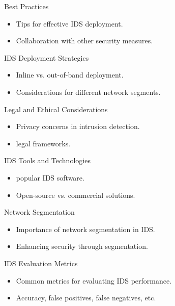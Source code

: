\documentclass{beamer}
\begin{document}
\begin{frame}{Best Practices}
    \begin{itemize}
        \item Tips for effective IDS deployment.
        \item Collaboration with other security measures.
    \end{itemize}
\end{frame}



\begin{frame}{IDS Deployment Strategies}
    \begin{itemize}
        \item Inline vs. out-of-band deployment.
        \item Considerations for different network segments.
    \end{itemize}
\end{frame}


\begin{frame}{Legal and Ethical Considerations}
    \begin{itemize}
        \item Privacy concerns in intrusion detection.
        \item legal frameworks.
    \end{itemize}
\end{frame}


\begin{frame}{IDS Tools and Technologies}
    \begin{itemize}
        \item popular IDS software.
        \item Open-source vs. commercial solutions.
    \end{itemize}
\end{frame}


\begin{frame}{Network Segmentation}
    \begin{itemize}
        \item Importance of network segmentation in IDS.
        \item Enhancing security through segmentation.
    \end{itemize}
\end{frame}


\begin{frame}{IDS Evaluation Metrics}
    \begin{itemize}
        \item Common metrics for evaluating IDS performance.
        \item Accuracy, false positives, false negatives, etc.
    \end{itemize}
\end{frame}
\end{document}
